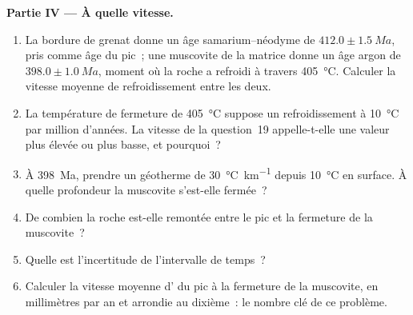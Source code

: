 \begin{problem}
\noindent\textbf{Partie IV --- À quelle vitesse.}
\begin{enumerate}[resume]
\item La bordure de grenat donne un âge samarium--néodyme de $412.0 \pm \qty{1.5}{Ma}$, pris
comme âge du pic~; une muscovite de la matrice donne un âge argon de $398.0 \pm
\qty{1.0}{Ma}$, moment où la roche a refroidi à travers \qty{405}{\celsius}. Calculer
la vitesse moyenne de refroidissement entre les deux.
\item La température de fermeture de \qty{405}{\celsius} suppose un refroidissement à
\qty{10}{\celsius} par million d'années. La vitesse de la question~19 appelle-t-elle une valeur plus élevée ou plus
basse, et pourquoi~?
\item À \qty{398}{Ma}, prendre un géotherme de \qty{30}{\celsius\per\km} depuis
\qty{10}{\celsius} en surface. À quelle profondeur la muscovite s'est-elle fermée~?
\item De combien la roche est-elle remontée entre le pic et la fermeture de la muscovite~?
\item Quelle est l'incertitude de l'intervalle de temps~?
\item Calculer la vitesse moyenne d' du pic à la fermeture de la muscovite, en
millimètres par an et arrondie au dixième~: le nombre clé de ce problème.
\end{enumerate}
\end{problem}
